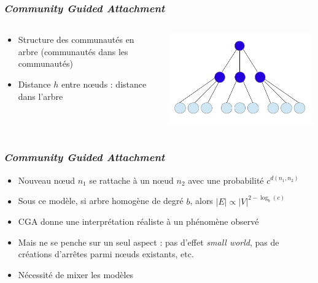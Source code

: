 \documentclass[c]{beamer}
\begin{document}
\begin{frame}
    \frametitle{\emph{Community Guided Attachment}}

    \begin{columns}
        \begin{column}{.5\textwidth}
            \begin{itemize}
                \item Structure des communautés en arbre (communautés dans les
                    communautés)
                \item Distance $h$ entre n\oe{}uds : distance dans l'arbre
            \end{itemize}
        \end{column}
        \begin{column}{.5\textwidth}
            \includegraphics[width=.7\textwidth]{./figures/tree.png}
        \end{column}
    \end{columns}
\end{frame}

\begin{frame}
    \frametitle{\emph{Community Guided Attachment}}
    \begin{itemize}
        \item Nouveau n\oe{}ud $n_1$ se rattache à un n\oe{}ud $n_2$
            avec une probabilité $c^{d(n_1, n_2)}$
        \item Sous ce modèle, si arbre homogène de degré $b$, alors $|E|
            \propto |V|^{2 - \log_b(c)}$
    \end{itemize}
\end{frame}

\begin{frame}
    \begin{itemize}
        \item CGA donne une interprétation réaliste à un phénomène observé
        \item Mais ne se penche sur un seul aspect : pas d'effet \emph{small
            world}, pas de créations d'arrêtes parmi n\oe{}uds existants, etc.
        \item Nécessité de mixer les modèles
    \end{itemize}
\end{frame}
\end{document}
